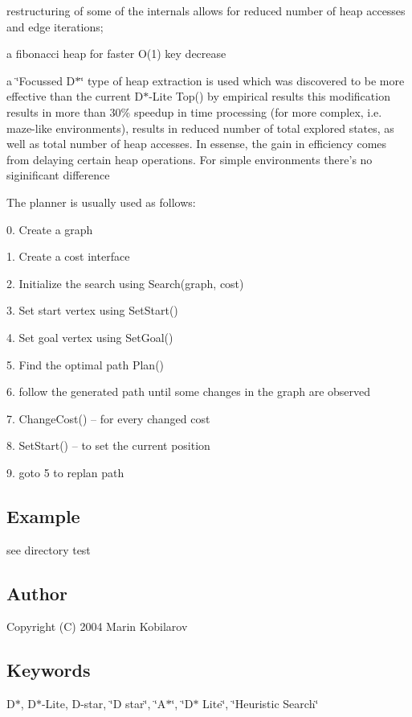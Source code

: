 \begin{DoxyItemize}
\item restructuring of some of the internals allows for reduced number of heap accesses and edge iterations;
\item a fibonacci heap for faster O(1) key decrease
\item a \char`\"{}\-Focussed D$\ast$\char`\"{} type of heap extraction is used which was discovered to be more effective than the current D$\ast$-\/\-Lite Top() by empirical results this modification results in more than 30\% speedup in time processing (for more complex, i.\-e. maze-\/like environments), results in reduced number of total explored states, as well as total number of heap accesses. In essense, the gain in efficiency comes from delaying certain heap operations. For simple environments there's no siginificant difference

The planner is usually used as follows\-:
\begin{DoxyItemize}
\item 0. Create a graph
\item 1. Create a cost interface
\item 2. Initialize the search using Search(graph, cost)
\item 3. Set start vertex using Set\-Start()
\item 4. Set goal vertex using Set\-Goal()
\item 5. Find the optimal path Plan()
\item 6. follow the generated path until some changes in the graph are observed
\item 7. Change\-Cost() -- for every changed cost
\item 8. Set\-Start() -- to set the current position
\item 9. goto 5 to replan path
\end{DoxyItemize}
\end{DoxyItemize}\subsection{Example}\label{index_Example}
see directory test \subsection{Author}\label{index_Author}
Copyright (C) 2004 Marin Kobilarov \subsection{Keywords}\label{index_Keywords}
D$\ast$, D$\ast$-\/\-Lite, D-\/star, \char`\"{}\-D star\char`\"{}, \char`\"{}\-A$\ast$\char`\"{}, \char`\"{}\-D$\ast$ Lite\char`\"{}, \char`\"{}\-Heuristic Search\char`\"{} 